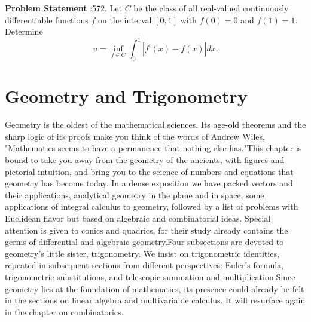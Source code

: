 \documentclass[10pt]{article}
\begin{document}
\textbf{Problem Statement} :572. Let $C$ be the class of all real-valued continuously differentiable functions $f$ on the interval $[0,1]$ with $f(0)=0$ and $f(1)=1$. Determine$$ u=\inf _{f \in C} \int_{0}^{1}\left|f^{\prime}(x)-f(x)\right| d x . $$\section{Geometry and Trigonometry}Geometry is the oldest of the mathematical sciences. Its age-old theorems and the sharp logic of its proofs make you think of the words of Andrew Wiles, "Mathematics seems to have a permanence that nothing else has."This chapter is bound to take you away from the geometry of the ancients, with figures and pictorial intuition, and bring you to the science of numbers and equations that geometry has become today. In a dense exposition we have packed vectors and their applications, analytical geometry in the plane and in space, some applications of integral calculus to geometry, followed by a list of problems with Euclidean flavor but based on algebraic and combinatorial ideas. Special attention is given to conics and quadrics, for their study already contains the germs of differential and algebraic geometry.Four subsections are devoted to geometry's little sister, trigonometry. We insist on trigonometric identities, repeated in subsequent sections from different perspectives: Euler's formula, trigonometric substitutions, and telescopic summation and multiplication.Since geometry lies at the foundation of mathematics, its presence could already be felt in the sections on linear algebra and multivariable calculus. It will resurface again in the chapter on combinatorics.\\
\end{document}
